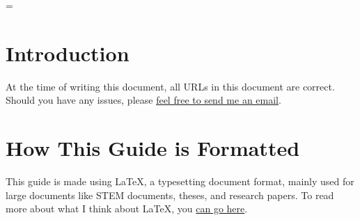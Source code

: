 \usepackage{hyperref}   %

\graphicspath{{./}}     %


\lstset{        %
  basicstyle=\ttfamily,
  frame=single,
  breaklines=true
}

\emergencystretch=\maxdimen
{}

\maketitle              %
\begin{center}
	\qrcode[hyperlink]{}
\end{center}
\tableofcontents        %
\todototoc				%
\listoftodos			%
\hypersetup{linkcolor=blue} %
\newpage                %
\flushleft

\section{Introduction}

At the time of writing this document, all URLs in this document are correct.
Should you have any issues, please
\underline{\href{mailto:HusseinEsmailContact@gmail.com}
{feel free to send me an email}}.

\section{How This Guide is Formatted}
This guide is made using \LaTeX{}, a typesetting document format, mainly used
for large documents like STEM documents, theses, and research papers. To read
more about what I think about \LaTeX{}, you
\href{https://husseinesmail.xyz/articles/is-latex-better.html}{can go here}.

\begin{comment}
	TODO commands (using the todonotes package):
	\TODO{}			-> Normal
	\TODOimg{}		-> Insert image
	\TODOcontent{}	-> Insert more content here
	\TODOfig{}		-> Insert figure
\end{comment}

